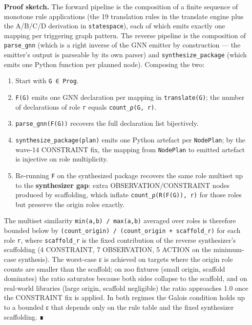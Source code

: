 \documentclass[
]{article}
\providecommand{\tightlist}{%
  \setlength{\itemsep}{0pt}\setlength{\parskip}{0pt}}
\begin{document}
\textbf{Proof sketch.} The forward pipeline is the composition of a
finite sequence of monotone rule applications (the 19 translation rules
in the translate engine plus the A/B/C/D derivation in
\texttt{statespace}), each of which emits exactly one mapping per
triggering graph pattern. The reverse pipeline is the composition of
\texttt{parse\_gnn} (which is a right inverse of the GNN emitter by
construction --- the emitter's output is parseable by its own parser)
and \texttt{synthesize\_package} (which emits one Python function per
planned node). Composing the two:

\begin{enumerate}
\def\labelenumi{\arabic{enumi}.}
\tightlist
\item
  Start with \texttt{G\ ∈\ Prog}.
\item
  \texttt{F(G)} emits one GNN declaration per mapping in
  \texttt{translate(G)}; the number of declarations of role \texttt{r}
  equals \texttt{count\_ρ(G,\ r)}.
\item
  \texttt{parse\_gnn(F(G))} recovers the full declaration list
  bijectively.
\item
  \texttt{synthesize\_package(plan)} emits one Python artefact per
  \texttt{NodePlan}; by the wave‑14 CONSTRAINT fix, the mapping from
  \texttt{NodePlan} to emitted artefact is injective on role
  multiplicity.
\item
  Re‑running \texttt{F} on the synthesized package recovers the same
  role multiset up to the \textbf{synthesizer gap}: extra
  OBSERVATION/CONSTRAINT nodes produced by scaffolding, which inflate
  \texttt{count\_ρ(R(F(G)),\ r)} for those roles but preserve the origin
  roles exactly.
\end{enumerate}

The multiset similarity \texttt{min(a,b)\ /\ max(a,b)} averaged over
roles is therefore bounded below by
\texttt{(count\_origin)\ /\ (count\_origin\ +\ scaffold\_r)} for each
role \texttt{r}, where \texttt{scaffold\_r} is the fixed contribution of
the reverse synthesizer's scaffolding (4 CONSTRAINT, 7 OBSERVATION, 5
ACTION on the minimum-case synthesis). The worst-case ε is achieved on
targets where the origin role counts are smaller than the scaffold; on
zoo fixtures (small origin, scaffold dominates) the ratio saturates
because both sides collapse to the scaffold, and on real-world libraries
(large origin, scaffold negligible) the ratio approaches 1.0 once the
CONSTRAINT fix is applied. In both regimes the Galois condition holds up
to a bounded ε that depends only on the rule table and the fixed
synthesizer scaffolding. ∎
\end{document}

